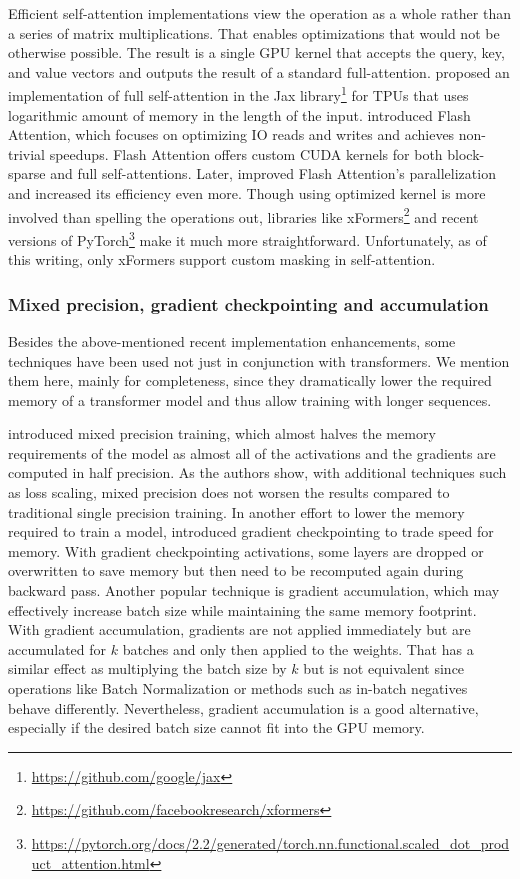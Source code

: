 Efficient self-attention implementations view the operation as a whole rather
than a series of matrix multiplications. That enables optimizations that would
not be otherwise possible. The result is a single GPU kernel that accepts the
query, key, and value vectors and outputs the result of a standard
full-attention. \cite{rabe2021self} proposed an implementation of full
self-attention in the Jax library\footnote{\url{https://github.com/google/jax}}
for TPUs that uses logarithmic amount of memory in the length of the input.
\cite{dao2022flashattention} introduced Flash Attention, which focuses on
optimizing IO reads and writes and achieves non-trivial speedups. Flash
Attention offers custom CUDA kernels for both block-sparse and full
self-attentions. Later, \cite{dao2023flashattention} improved Flash Attention's
parallelization and increased its efficiency even more. Though using optimized
kernel is more involved than spelling the operations out, libraries like
xFormers\footnote{\url{https://github.com/facebookresearch/xformers}} and
recent versions of
PyTorch\footnote{\url{https://pytorch.org/docs/2.2/generated/torch.nn.functional.scaled_dot_product_attention.html}}
make it much more straightforward. Unfortunately, as of this writing, only
xFormers support custom masking in self-attention.

\subsubsection{Mixed precision, gradient checkpointing and accumulation}

Besides the above-mentioned recent implementation enhancements, some techniques
have been used not just in conjunction with transformers. We mention them here,
mainly for completeness, since they dramatically lower the required memory of a
transformer model and thus allow training with longer sequences.

\cite{micikevicius2017mixed} introduced mixed precision training, which almost
halves the memory requirements of the model as almost all of the activations
and the gradients are computed in half precision. As the authors show, with
additional techniques such as loss scaling, mixed precision does not worsen the
results compared to traditional single precision training. In another effort to
lower the memory required to train a model, \cite{chen2016training} introduced
gradient checkpointing to trade speed for memory. With gradient checkpointing
activations, some layers are dropped or overwritten to save memory but then
need to be recomputed again during backward pass. Another popular technique is
gradient accumulation, which may effectively increase batch size while
maintaining the same memory footprint. With gradient accumulation, gradients
are not applied immediately but are accumulated for $k$ batches and only then
applied to the weights. That has a similar effect as multiplying the batch size
by $k$ but is not equivalent since operations like Batch
Normalization \citep{ioffe2015batch} or methods such as in-batch negatives
behave differently. Nevertheless, gradient accumulation is a good alternative,
especially if the desired batch size cannot fit into the GPU memory.

